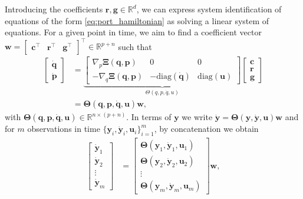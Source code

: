 \documentclass[11pt, a4paper]{article}
\theoremstyle{plain}
\theoremstyle{definition}
\theoremstyle{remark}
\begin{document}
Introducing the coefficients $\mathbf{r},\mathbf{g} \in \mathbb R^d$, we can express system identification of equations of the form \eqref{eq:port_hamiltonian} as solving a linear system of equations. For a given point in time, we aim to find a coefficient vector $\mathbf{w} = \begin{bmatrix}\mathbf{c}^{\top} & \mathbf{r}^{\top} & \mathbf{g}^{\top}\end{bmatrix}^{\top} \in \mathbb R^{p + n}$ such that
\begin{align*}
    \begin{bmatrix}
        \dot{\mathbf{q}} \\
        \dot{\mathbf{p}}
        \end{bmatrix}
        &= \underbrace{
        \begin{bmatrix}
    \nabla_p \boldsymbol{\Xi}(\mathbf{q},\mathbf{p}) & 0 & 0\\
    -\nabla_q \boldsymbol{\Xi}(\mathbf{q},\mathbf{p}) & -\mathrm{diag}(\dot{\mathbf{q}}) &  \mathrm{diag}(\mathbf{u})
\end{bmatrix}}_{\Theta(q,p,\dot q, u)}
\begin{bmatrix}
    \mathbf{c} \\
    \mathbf{r} \\
    \mathbf{g}
\end{bmatrix}\\
&= \boldsymbol{\Theta}(\mathbf{q},\mathbf{p},\dot{\mathbf{q}}, \mathbf{u}) \mathbf{w},
\end{align*}
with $\boldsymbol{\Theta}(\mathbf{q},\mathbf{p},\dot{\mathbf{q}}, \mathbf{u}) \in \mathbb R^{n \times (p + n)}$. In terms of $\mathbf{y}$ we write $\dot{\mathbf{y}} = \boldsymbol{\Theta}(\mathbf{y},\dot{\mathbf{y}},\mathbf{u}) \mathbf{w}$ and 
for $m$ observations in time $\{\mathbf{y}_i,\dot{\mathbf{y}}_i, \mathbf{u}_i\}_{i=1}^m$, by concatenation we obtain
\begin{align*}
    \begin{bmatrix}
        \dot{\mathbf{y}}_1 \\
        \dot{\mathbf{y}}_2 \\
        \vdots \\
        \dot{\mathbf{y}}_m
        \end{bmatrix} &= \begin{bmatrix}
    \boldsymbol{\Theta}(\mathbf{y}_1,\dot{\mathbf{y}}_1,\mathbf{u}_1) \\
    \boldsymbol{\Theta}(\mathbf{y}_2,\dot{\mathbf{y}}_2,\mathbf{u}_2) \\
    \vdots \\
    \boldsymbol{\Theta}(\mathbf{y}_m,\dot{\mathbf{y}}_m,\mathbf{u}_m)
\end{bmatrix} \mathbf{w},
\end{align*}
\end{document}
